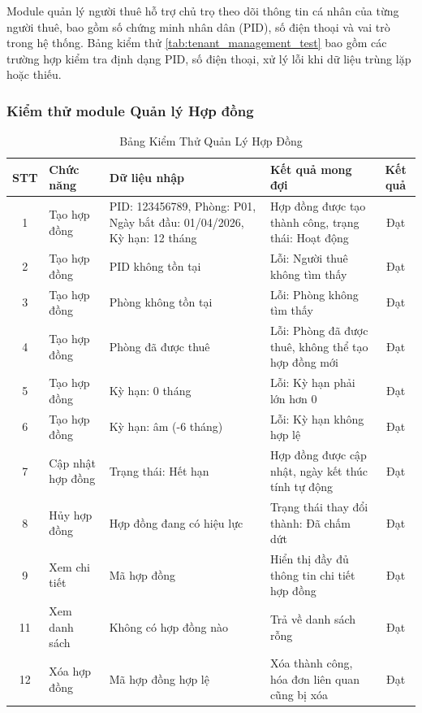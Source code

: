Module quản lý người thuê hỗ trợ chủ trọ theo dõi thông tin cá nhân của từng người thuê, bao gồm số chứng minh nhân dân (PID), số điện thoại và vai trò trong hệ thống. Bảng kiểm thử \ref{tab:tenant_management_test} bao gồm các trường hợp kiểm tra định dạng PID, số điện thoại, xử lý lỗi khi dữ liệu trùng lặp hoặc thiếu.


\subsubsection{Kiểm thử module Quản lý Hợp đồng}

\begin{table}[H]
    \centering
    \caption{Bảng Kiểm Thử Quản Lý Hợp Đồng}
    \label{tab:contract_management_test}
    \vspace{2mm}
    \begin{small}
    \begin{tabularx}{\textwidth}{|c|l|X|X|c|}
    \hline
    \textbf{STT} & \textbf{Chức năng} & \textbf{Dữ liệu nhập} & \textbf{Kết quả mong đợi} & \textbf{Kết quả} \\ \hline
    1 & Tạo hợp đồng & PID: 123456789, Phòng: P01, Ngày bắt đầu: 01/04/2026, Kỳ hạn: 12 tháng & Hợp đồng được tạo thành công, trạng thái: Hoạt động & Đạt \\ \hline
    2 & Tạo hợp đồng & PID không tồn tại & Lỗi: Người thuê không tìm thấy & Đạt \\ \hline
    3 & Tạo hợp đồng & Phòng không tồn tại & Lỗi: Phòng không tìm thấy & Đạt \\ \hline
    4 & Tạo hợp đồng & Phòng đã được thuê & Lỗi: Phòng đã được thuê, không thể tạo hợp đồng mới & Đạt \\ \hline
    5 & Tạo hợp đồng & Kỳ hạn: 0 tháng & Lỗi: Kỳ hạn phải lớn hơn 0 & Đạt \\ \hline
    6 & Tạo hợp đồng & Kỳ hạn: âm (-6 tháng) & Lỗi: Kỳ hạn không hợp lệ & Đạt \\ \hline
    7 & Cập nhật hợp đồng & Trạng thái: Hết hạn & Hợp đồng được cập nhật, ngày kết thúc tính tự động & Đạt \\ \hline
    8 & Hủy hợp đồng & Hợp đồng đang có hiệu lực & Trạng thái thay đổi thành: Đã chấm dứt & Đạt \\ \hline
    9 & Xem chi tiết & Mã hợp đồng & Hiển thị đầy đủ thông tin chi tiết hợp đồng & Đạt \\ \hline
    11 & Xem danh sách & Không có hợp đồng nào & Trả về danh sách rỗng & Đạt \\ \hline
    12 & Xóa hợp đồng & Mã hợp đồng hợp lệ & Xóa thành công, hóa đơn liên quan cũng bị xóa & Đạt \\ \hline
    \end{tabularx}
    \end{small}
\end{table}

